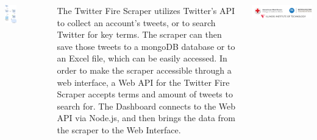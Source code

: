 \documentclass{tikzposter}
\begin{document}
\begin{columns}
    {
        \begin{tikzfigure}%
            \includegraphics[width=0.3\textwidth]{application-diagram.png}
        \end{tikzfigure}
        {
        \fontsize{36pt}{14pt}\selectfont
        The Twitter Fire Scraper utilizes Twitter's API to collect an account's tweets, or to search Twitter for key terms. The scraper can then save those tweets to a mongoDB database or to an Excel file, which can be easily accessed. In order to make the scraper accessible through a web interface, a Web API for the Twitter Fire Scraper accepts terms and amount of tweets to search for. The Dashboard connects to the Web API via Node.js, and then brings the data from the scraper to the Web Interface.
        }
    }
    
    \block{}%
    {
        \vspace{-2.5cm}
        \begin{tikzfigure}[]
        \includegraphics[scale=0.4]{Logos.png}
        \end{tikzfigure} 
    }

    
\end{columns}
\end{document}
